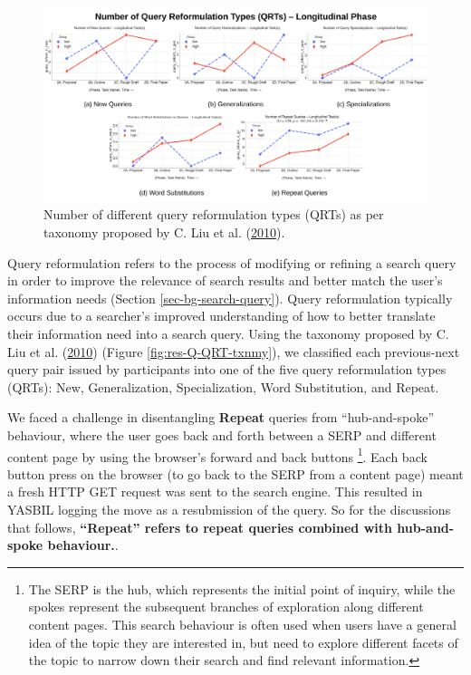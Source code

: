 \documentclass[letterpaper, nobind]{templates/ociamthesis}
\begin{document}
\begin{figure}

{\centering \includegraphics[width=1\linewidth]{figs/rp2-qrt} 

}

\caption[Query reformulation counts for longitudinal phase.]{Number of different query reformulation types (QRTs) as per taxonomy proposed by C. Liu et al. (\protect\hyperlink{ref-liu2010analysis}{2010}).}\label{fig:rp2-qrt}
\end{figure}





Query reformulation refers to the process of modifying or refining a search query in order to improve the relevance of search results and better match the user's information needs (Section \ref{sec-bg-search-query}).
Query reformulation typically occurs due to a searcher's improved understanding of how to better translate their information need into a search query.
Using the taxonomy proposed by C. Liu et al. (\protect\hyperlink{ref-liu2010analysis}{2010}) (Figure \ref{fig:res-Q-QRT-txnmy}), we classified each previous-next query pair issued by participants into one of the five query reformulation types (QRTs):
New,
Generalization,
Specialization,
Word Substitution,
and
Repeat.

We faced a challenge in disentangling \textbf{Repeat} queries from ``hub-and-spoke'' behaviour, where the user goes back and forth between a SERP and different content page by using the browser's forward and back buttons \footnote{The SERP is the hub, which represents the initial point of inquiry, while the spokes represent the subsequent branches of exploration along different content pages. This search behaviour is often used when users have a general idea of the topic they are interested in, but need to explore different facets of the topic to narrow down their search and find relevant information.}.
Each back button press on the browser (to go back to the SERP from a content page) meant a fresh HTTP GET request was sent to the search engine.
This resulted in YASBIL logging the move as a resubmission of the query.
So for the discussions that follows, \textbf{``Repeat'' refers to repeat queries combined with hub-and-spoke behaviour.}.
\end{document}
